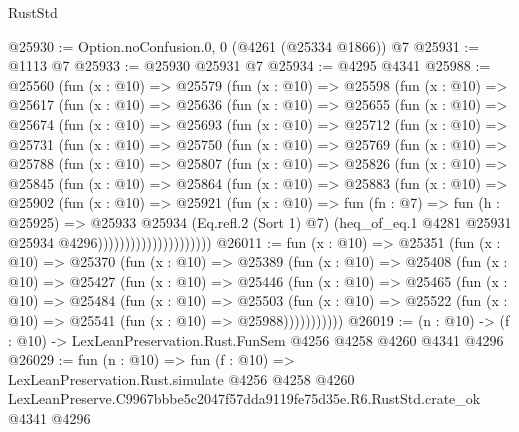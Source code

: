 \begin{lexlean}{RustStd}
\begin{coremodule}
@25930 := Option.noConfusion.{0, 0} (@4261 (@25334 @1866)) @7
@25931 := @1113 @7
@25933 := @25930 @25931 @7
@25934 := @4295 @4341
@25988 := @25560
    (fun (x : @10) =>
    @25579
      (fun (x : @10) =>
      @25598
        (fun (x : @10) =>
        @25617
          (fun (x : @10) =>
          @25636
            (fun (x : @10) =>
            @25655
              (fun (x : @10) =>
              @25674
                (fun (x : @10) =>
                @25693
                  (fun (x : @10) =>
                  @25712
                    (fun (x : @10) =>
                    @25731
                      (fun (x : @10) =>
                      @25750
                        (fun (x : @10) =>
                        @25769
                          (fun (x : @10) =>
                          @25788
                            (fun (x : @10) =>
                            @25807
                              (fun (x : @10) =>
                              @25826
                                (fun (x : @10) =>
                                @25845
                                  (fun (x : @10) =>
                                  @25864
                                    (fun (x : @10) =>
                                    @25883
                                      (fun (x : @10) =>
                                      @25902
                                        (fun (x : @10) =>
                                        @25921
                                          (fun (x : @10) =>
                                          fun (fn : @7) =>
                                          fun (h : @25925) =>
                                          @25933
                                            @25934
                                            (Eq.refl.{2} (Sort 1) @7)
                                            (heq_of_eq.{1}
                                              @4281
                                              @25931
                                              @25934
                                              @4296)))))))))))))))))))))
@26011 := fun (x : @10) =>
  @25351
    (fun (x : @10) =>
    @25370
      (fun (x : @10) =>
      @25389
        (fun (x : @10) =>
        @25408
          (fun (x : @10) =>
          @25427
            (fun (x : @10) =>
            @25446
              (fun (x : @10) =>
              @25465
                (fun (x : @10) =>
                @25484
                  (fun (x : @10) =>
                  @25503
                    (fun (x : @10) =>
                    @25522 (fun (x : @10) => @25541 (fun (x : @10) => @25988)))))))))))
@26019 := (n : @10) -> (f : @10) -> LexLeanPreservation.Rust.FunSem @4256 @4258 @4260 @4341 @4296
@26029 := fun (n : @10) =>
  fun (f : @10) =>
  LexLeanPreservation.Rust.simulate
    @4256
    @4258
    @4260
    LexLeanPreserve.C9967bbbe5c2047f57dda9119fe75d35e.R6.RustStd.crate_ok
    @4341
    @4296
\end{coremodule}
\end{lexlean}
